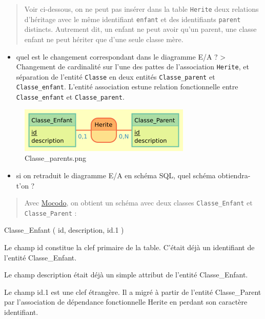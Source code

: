 \documentclass[11pt]{article}
\makeatletter
\def\maxwidth{\ifdim\Gin@nat@width>\linewidth\linewidth
    \else\Gin@nat@width\fi}
\let\Oldincludegraphics\includegraphics
\renewcommand{\includegraphics}[1]{\Oldincludegraphics[width=.8\maxwidth]{#1}}
\providecommand{\tightlist}{%
      \setlength{\itemsep}{0pt}\setlength{\parskip}{0pt}}
\makeatother
\begin{document}
\begin{quote}
Voir ci-dessous, on ne peut pas insérer dans la table \texttt{Herite}
deux relations d'héritage avec le même identifiant \texttt{enfant} et
des identifiants \texttt{parent} distincts. Autrement dit, un enfant ne
peut avoir qu'un parent, une classe enfant ne peut hériter que d'une
seule classe mère.
\end{quote}

\begin{itemize}
\tightlist
\item
  quel est le changement correspondant dans le diagramme E/A ?
  \textgreater{} Changement de cardinalité sur l'une des pattes de
  l'association \texttt{Herite}, et séparation de l'entité
  \texttt{Classe} en deux entités \texttt{Classe\_parent} et
  \texttt{Classe\_enfant}. L'entité association estune relation
  fonctionnelle entre \texttt{Classe\_enfant} et
  \texttt{Classe\_parent}.
\end{itemize}

\begin{figure}
\centering
\includegraphics{mocodo/Classe_parents/Classe_parents.png}
\caption{Classe\_parents.png}
\end{figure}

\begin{itemize}
\tightlist
\item
  si on retraduit le diagramme E/A en schéma SQL, quel schéma
  obtiendra-t'on ?
\end{itemize}

\begin{quote}
Avec \href{http://mocodo.wingi.net/}{Mocodo}, on obtient un schéma avec
deux classes \texttt{Classe\_Enfant} et \texttt{Classe\_Parent} :
\end{quote}

\hypertarget{mld}{}
{Classe\_Enfant} ( {id}, {description}, {id.1} )

Le champ id constitue la clef primaire de la table. C'était déjà un
identifiant de l'entité Classe\_Enfant.

Le champ description était déjà un simple attribut de l'entité
Classe\_Enfant.

Le champ id.1 est une clef étrangère. Il a migré à partir de l'entité
Classe\_Parent par l'association de dépendance fonctionnelle Herite en
perdant son caractère identifiant.
\end{document}
